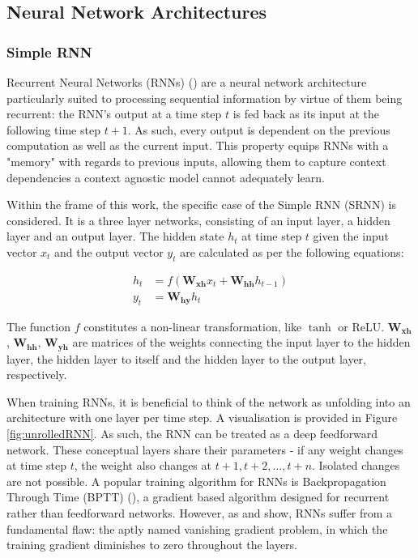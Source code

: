 \subsection{Neural Network Architectures}\label{neuralNetworkArchitectures}

\subsubsection{Simple RNN}\label{SRNN}
Recurrent Neural Networks (RNNs) (\cite{Elman1990}) are a neural network architecture particularly suited to processing sequential information by virtue of them being recurrent: the RNN's output at a time step $t$ is fed back as its input at the following time step $t+1$. As such, every output is dependent on the previous computation as well as the current input. This property equips RNNs with a "memory" with regards to previous inputs, allowing them to capture context dependencies a context agnostic model cannot adequately learn.

Within the frame of this work, the specific case of the Simple RNN (SRNN) is considered. It is a three layer networks, consisting of an input layer, a hidden layer and an output layer. The hidden state $h_t$ at time step $t$ given the input vector $x_t$ and the output vector $y_t$ are calculated as per the following equations:

\begin{align}
	h_{t} &= f(\boldsymbol{W_{xh}} x_{t} + \boldsymbol{W_{hh}} h_{t-1}) \\
	y_{t} &= \boldsymbol{W_{hy}} h_{t}
\end{align}

The function $f$ constitutes a non-linear transformation, like $\tanh$ or ReLU. $\boldsymbol{W_{xh}}$, $\boldsymbol{W_{hh}}$, $\boldsymbol{W_{yh}}$ are matrices of the weights connecting the input layer to the hidden layer, the hidden layer to itself and the hidden layer to the output layer, respectively.

When training RNNs, it is beneficial to think of the network as unfolding into an architecture with one layer per time step. A visualisation is provided in Figure \ref{fig:unrolledRNN}. As such, the RNN can be treated as a deep feedforward network. These conceptual layers share their parameters - if any weight changes at time step $t$, the weight also changes at $t+1, t+2, \dots, t+n$. Isolated changes are not possible. A popular training algorithm for RNNs is Backpropagation Through Time (BPTT) (\cite{Williams1998}), a gradient based algorithm designed for recurrent rather than feedforward networks. However, as \cite{Bengio1994} and \cite{Hochreiter1998} show, RNNs suffer from a fundamental flaw: the aptly named vanishing gradient problem, in which the training gradient diminishes to zero throughout the layers.

